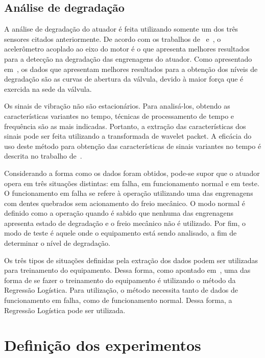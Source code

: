 \subsection{Análise de degradação}
\label{sub:estudo-caso-analise-degradacao}

A análise de degradação do atuador é feita utilizando somente um dos três sensores citados
anteriormente. De acordo com os trabalhos de~\cite{boesch2011deteccao}
e~\cite{faccin2011manutencao}, o acelerômetro acoplado ao eixo do motor é o que apresenta melhores
resultados para a detecção na degradação das engrenagens do atuador. Como apresentado
em~\cite{lazzaretti2012avaliacao}, os dados que apresentam melhores resultados para a obtenção dos
níveis de degradação são as curvas de abertura da válvula, devido à maior força que é exercida na
sede da válvula.

Os sinais de vibração não são estacionários. Para analisá-los, obtendo as características variantes
no tempo, técnicas de processamento de tempo e frequência são as mais indicadas. Portanto, a
extração das características dos sinais pode ser feita utilizando a transformada de wavelet packet.
A eficácia do uso deste método para obtenção das características de sinais variantes no tempo é
descrita no trabalho de~\cite{qiu2006wavelet}.

Considerando a forma como os dados foram obtidos, pode-se supor que o atuador opera em três
situações distintas: em falha, em funcionamento normal e em teste. O funcionamento em falha se
refere à operação utilizando uma das engrenagens com dentes quebrados sem acionamento do freio
mecânico. O modo normal é definido como a operação quando é sabido que nenhuma das engrenagens
apresenta estado de degradação e o freio mecânico não é utilizado. Por fim, o modo de teste é aquele
onde o equipamento está sendo analisado, a fim de determinar o nível de degradação.

Os três tipos de situações definidas pela extração dos dados podem ser utilizadas para treinamento
do equipamento. Dessa forma, como apontado em~\cite{lazzaretti2012avaliacao}, uma das forma de se
fazer o treinamento do equipamento é utilizando o método da Regressão Logística. Para utilização, o
método necessita tanto de dados de funcionamento em falha, como de funcionamento normal. Dessa
forma, a Regressão Logística pode ser utilizada.


\section{Definição dos experimentos}
\label{sec:experimentos-definicao}

